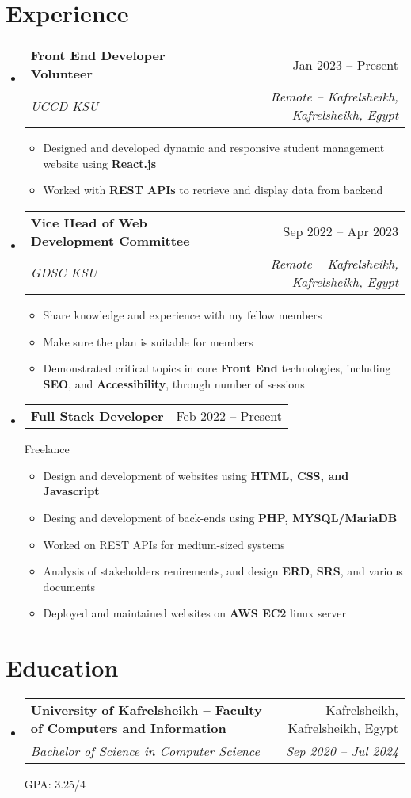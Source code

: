 \documentclass[a4paper,11pt]{article}
\makeatletter
\newcommand{\resumeItem}[1]{
  \item\small{#1}
}
\newcommand{\resumeItemListStart}{\begin{itemize}[rightmargin=0.11in]}
\newcommand{\resumeItemListEnd}{\end{itemize}}
\newcommand{\resumeQuadHeading}[4]{
  \item
  \begin{tabular*}{0.96\textwidth}[t]{l@{\extracolsep{\fill}}r}
    \textbf{#1} & #2 \\
    \textit{\small#3} & \textit{\small #4} \\
  \end{tabular*}
}
\newcommand{\resumeQuadHeadingChild}[2]{
  \item
  \begin{tabular*}{0.96\textwidth}[t]{l@{\extracolsep{\fill}}r}
    \textbf{\small#1} & {\small#2} \\
  \end{tabular*}
}
\newcommand{\resumeHeadingListStart}{
  \begin{itemize}[leftmargin=0.15in, label={}]
}
\newcommand{\resumeHeadingListEnd}{\end{itemize}}
\makeatother
\begin{document}

\section{Experience}
\resumeHeadingListStart{}
  \resumeQuadHeading{Front End Developer Volunteer}{Jan 2023 -- Present}
  {UCCD KSU}{Remote -- Kafrelsheikh, Kafrelsheikh, Egypt}
    \resumeItemListStart{}
      \resumeItem{Designed and developed dynamic and responsive student management website using \textbf{React.js}}
      \resumeItem{Worked with \textbf{REST APIs} to retrieve and display data from backend}
    \resumeItemListEnd{}

  \resumeQuadHeading{Vice Head of Web Development Committee}{Sep 2022 -- Apr 2023}
  {GDSC KSU}{Remote -- Kafrelsheikh, Kafrelsheikh, Egypt}
    \resumeItemListStart{}
      \resumeItem{Share knowledge and experience with my fellow members}
      \resumeItem{Make sure the plan is suitable for members}
      \resumeItem{Demonstrated critical topics in core \textbf{Front End} technologies, including \textbf{SEO}, and \textbf{Accessibility}, through number of sessions}
    \resumeItemListEnd{}

  \resumeQuadHeadingChild{Full Stack Developer}{Feb 2022 -- Present}
  {Freelance}
    \resumeItemListStart{}
      \resumeItem{Design and development of websites using \textbf{HTML, CSS, and Javascript}}
      \resumeItem{Desing and development of back-ends using \textbf{PHP, MYSQL/MariaDB}}
      \resumeItem{Worked on REST APIs for medium-sized systems}
      \resumeItem{Analysis of stakeholders reuirements, and design \textbf{ERD}, \textbf{SRS}, and various documents}
      \resumeItem{Deployed and maintained websites on \textbf{AWS EC2} linux server}
    \resumeItemListEnd{}
\resumeHeadingListEnd{}



\section{Education}
  \resumeHeadingListStart{}
    \resumeQuadHeading{University of Kafrelsheikh -- Faculty of Computers and Information}{Kafrelsheikh, Kafrelsheikh, Egypt}
    {Bachelor of Science in Computer Science}{Sep 2020 -- Jul 2024}
    {GPA: 3.25/4}
  \resumeHeadingListEnd{}
\end{document}
